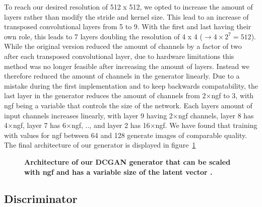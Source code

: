             To reach our desired resolution of 512 x 512, we opted to increase the amount of layers rather than modify the stride and kernel size. This lead to an increase of transposed convolutional layers from 5 to 9. With the first and last having their own role, this leads to 7 layers doubling the resolution of 4 x 4 ($\rightarrow 4 \times 2^7 = 512$). While the original version reduced the amount of channels by a factor of two after each transposed convolutional layer, due to hardware limitations this method was no longer feasible after increasing the amount of layers. Instead we therefore reduced the amount of channels in the generator linearly. Due to a mistake during the first implementation and to keep backwards compatability,  the last layer in the generator reduces the amount of channels from 2$\times$ngf to 3, with ngf being a variable that controls the size of the network. Each layers amount of input channels increases linearly, with layer 9 having 2$\times$ngf channels, layer 8 has 4$\times$ngf, layer 7 has 6$\times$ngf, .., and layer 2 has 16$\times$ngf. We have found that training with values for ngf between 64 and 128 generate images of comparable quality. The final architecture of our generator is displayed in figure~\ref{fig:architecture_dcgan_ours_generator}
        
            \begin{figure}[h]
                \centering
                \caption[DCGAN generator architecture]
                {
                    \textbf{Architecture of our DCGAN generator that can be scaled with ngf and has a variable size of the latent vector .}
                }
                \label{fig:architecture_dcgan_ours_generator}
            \end{figure}

        \subsection{Discriminator}

